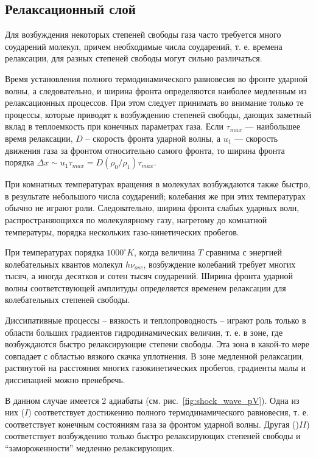 \documentclass[10pt, a4paper]{article}
\begin{document}
\subsection{Релаксационный слой}

Для возбуждения некоторых степеней свободы газа часто требуется много соударений молекул, причем необходимые числа соударений, т. е. времена релаксации, для разных степеней свободы могут сильно различаться.

Время установления полного термодинамического равновесия во фронте ударной волны, а следовательно, и ширина фронта определяются наиболее медленным из релаксационных процессов. При этом следует принимать во внимание только те процессы, которые приводят к возбуждению степеней свободы, дающих заметный вклад в теплоемкость при конечных параметрах газа. Если $\tau_{max}$ — наибольшее время релаксации, $D$ -- скорость фронта ударной волны, а $u_1$ — скорость движения газа за фронтом относительно самого фронта, то ширина фронта порядка $\Delta x\sim u_1\tau_{max}=D(\rho_0/\rho_1) \tau_{max}$.

При комнатных температурах вращения в молекулах возбуждаются также быстро, в результате небольшого числа соударений; колебания же при этих температурах обычно не играют роли. Следовательно, ширина фронта слабых ударных волн, распространяющихся по молекулярному газу, нагретому до комнатной температуры, порядка нескольких газо-кинетических пробегов. 

При температурах порядка $1000^\circ K$, когда величина $T$ сравнима с энергией колебательных квантов молекул $h\nu_{osc}$, возбуждение колебаний требует многих тысяч, а иногда десятков и сотен тысяч соударений. Ширина фронта ударной волны соответствующей амплитуды определяется временем релаксации для колебательных степеней свободы. 

Диссипативные процессы -- вязкость и теплопроводность -- играют роль только в области больших градиентов гидродинамических величин, т. е. в зоне, где возбуждаются быстро релаксирующие степени свободы. Эта зона в какой-то мере совпадает с областью вязкого скачка уплотнения. В зоне медленной релаксации, растянутой на расстояния многих газокинетических пробегов, градиенты малы и диссипацией можно пренебречь.

В данном случае имеется 2 адиабаты (см. рис.~\ref{fig:shock_wave_pV}). Одна из них ($I$) соответствует достижению полного термодинамического равновесия, т. е. соответствует конечным состояниям газа за фронтом ударной волны. Другая ()$II$) соответствует возбуждению только быстро релаксирующих степеней
свободы и ``замороженности'' медленно релаксирующих.
\end{document}
